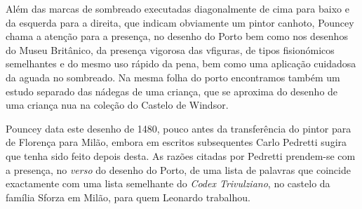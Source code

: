 \documentclass{article}
\begin{document}
Além das marcas de sombreado executadas diagonalmente de cima para
baixo e da esquerda para a direita, que indicam obviamente um pintor
canhoto, Pouncey chama a atenção para a presença, no desenho do Porto
bem como nos desenhos do Museu Britânico, da presença vigorosa das
vfiguras, de tipos fisionómicos semelhantes e do mesmo uso rápido da
pena, bem como uma aplicação cuidadosa da aguada no sombreado. Na
mesma folha do porto encontramos também um estudo separado das nádegas
de uma criança, que se aproxima do desenho de uma criança nua na
coleção do Castelo de Windsor.

Pouncey data este desenho de 1480, pouco antes da transferência do
pintor para de Florença para Milão, embora em escritos subsequentes
Carlo Pedretti sugira que tenha sido feito depois desta. As razões
citadas por Pedretti prendem-se com a presença, no \emph{verso} do
desenho do Porto, de uma lista de palavras que coincide exactamente
com uma lista semelhante do \emph{Codex Trivulziano}, no castelo da
família Sforza em Milão, para quem Leonardo trabalhou.

\printbibliography[heading=bibliography,title={Bibliografia}]
\end{document}
